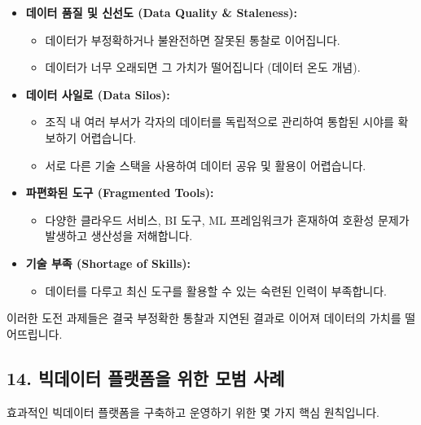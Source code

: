 \documentclass[11pt,a4paper]{article}
\theoremstyle{definition}
\begin{document}
\begin{itemize}
    \item \textbf{데이터 품질 및 신선도 (Data Quality & Staleness):}
    \begin{itemize}
        \item 데이터가 부정확하거나 불완전하면 잘못된 통찰로 이어집니다.
        \item 데이터가 너무 오래되면 그 가치가 떨어집니다 (데이터 온도 개념).
    \end{itemize}
    \item \textbf{데이터 사일로 (Data Silos):}
    \begin{itemize}
        \item 조직 내 여러 부서가 각자의 데이터를 독립적으로 관리하여 통합된 시야를 확보하기 어렵습니다.
        \item 서로 다른 기술 스택을 사용하여 데이터 공유 및 활용이 어렵습니다.
    \end{itemize}
    \item \textbf{파편화된 도구 (Fragmented Tools):}
    \begin{itemize}
        \item 다양한 클라우드 서비스, BI 도구, ML 프레임워크가 혼재하여 호환성 문제가 발생하고 생산성을 저해합니다.
    \end{itemize}
    \item \textbf{기술 부족 (Shortage of Skills):}
    \begin{itemize}
        \item 데이터를 다루고 최신 도구를 활용할 수 있는 숙련된 인력이 부족합니다.
    \end{itemize}
\end{itemize}
이러한 도전 과제들은 결국 부정확한 통찰과 지연된 결과로 이어져 데이터의 가치를 떨어뜨립니다.

\subsection*{14. 빅데이터 플랫폼을 위한 모범 사례}

효과적인 빅데이터 플랫폼을 구축하고 운영하기 위한 몇 가지 핵심 원칙입니다.
\end{document}
